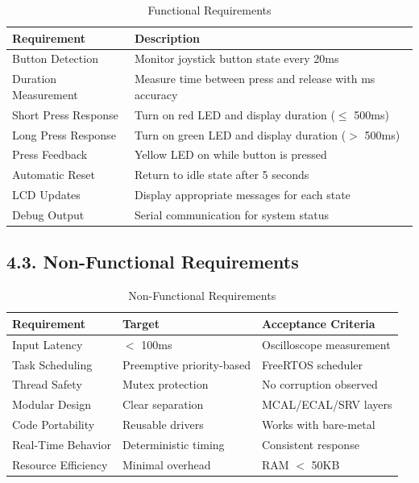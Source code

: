 \documentclass[12pt]{article}
\begin{document}
\begin{table}[H]
	\centering
	\caption{Functional Requirements}
	\label{tab:functional-requirements}
	\begin{tabular}{|l|l|}
		\hline
		\textbf{Requirement} & \textbf{Description} \\
		\hline
		Button Detection & Monitor joystick button state every 20ms \\
		\hline
		Duration Measurement & Measure time between press and release with ms accuracy \\
		\hline
		Short Press Response & Turn on red LED and display duration ($\leq$ 500ms) \\
		\hline
		Long Press Response & Turn on green LED and display duration ($>$ 500ms) \\
		\hline
		Press Feedback & Yellow LED on while button is pressed \\
		\hline
		Automatic Reset & Return to idle state after 5 seconds \\
		\hline
		LCD Updates & Display appropriate messages for each state \\
		\hline
		Debug Output & Serial communication for system status \\
		\hline
	\end{tabular}
\end{table}

\subsection*{4.3. Non-Functional Requirements}

\begin{table}[H]
	\centering
	\caption{Non-Functional Requirements}
	\label{tab:non-functional-requirements}
	\begin{tabular}{|l|l|l|}
		\hline
		\textbf{Requirement} & \textbf{Target} & \textbf{Acceptance Criteria} \\
		\hline
		Input Latency & $<$ 100ms & Oscilloscope measurement \\
		\hline
		Task Scheduling & Preemptive priority-based & FreeRTOS scheduler \\
		\hline
		Thread Safety & Mutex protection & No corruption observed \\
		\hline
		Modular Design & Clear separation & MCAL/ECAL/SRV layers \\
		\hline
		Code Portability & Reusable drivers & Works with bare-metal \\
		\hline
		Real-Time Behavior & Deterministic timing & Consistent response \\
		\hline
		Resource Efficiency & Minimal overhead & RAM $<$ 50KB \\
		\hline
	\end{tabular}
\end{table}
\end{document}
